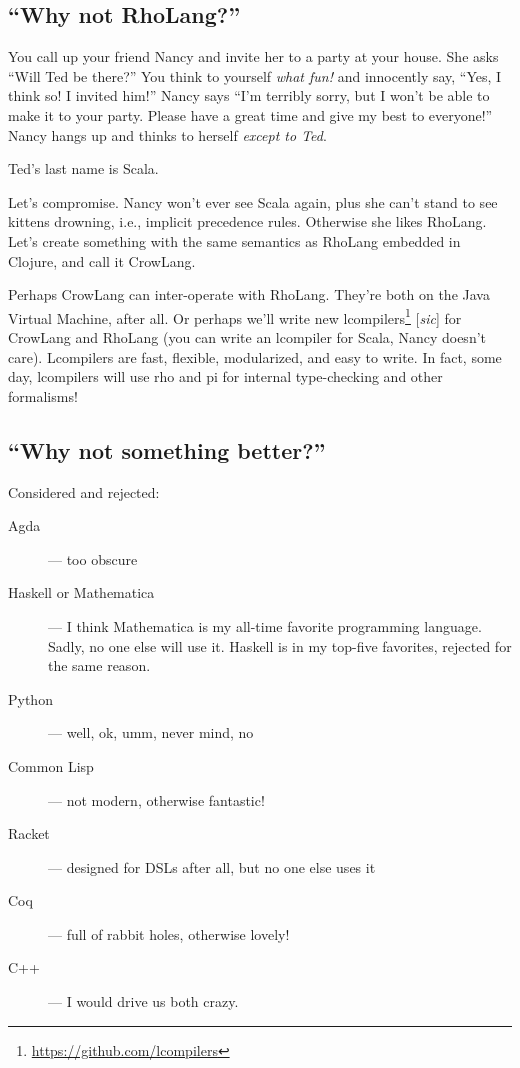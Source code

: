\documentclass[10pt,oneside,x11names]{article}
\theoremstyle{definition}
\theoremstyle{warning}
\begin{document}
\subsection{``Why not RhoLang?''}
\label{sec:orgc2be556}

You call up your friend Nancy and invite her to a party at your
house. She asks ``Will Ted be there?'' You think to yourself
\emph{what fun!} and innocently say, ``Yes, I think so! I invited him!''
Nancy says ``I'm terribly sorry, but I won't be able to make it to
your party. Please have a great time and give my best to
everyone!'' Nancy hangs up and thinks to herself \emph{except to Ted}.

Ted's last name is Scala.

Let's compromise. Nancy won't ever see Scala again, plus she can't
stand to see kittens drowning, i.e., implicit precedence rules.
Otherwise she likes RhoLang. Let's create something with the same
semantics as RhoLang embedded in Clojure, and call it CrowLang.

Perhaps CrowLang can inter-operate with RhoLang. They're both on
the Java Virtual Machine, after all. Or perhaps we'll write new
lcompilers\footnote{\url{https://github.com/lcompilers}\label{org689557b}} [\textit{sic}]
for CrowLang and RhoLang (you can write an lcompiler for Scala, Nancy
doesn't care). Lcompilers are fast, flexible, modularized, and
easy to write. In fact, some day, lcompilers will use rho and pi
for internal type-checking and other formalisms!

\subsection{``Why not something better?''}
\label{sec:orgd9bea58}

Considered and rejected:

\begin{description}
\item[{Agda}] --- too obscure

\item[{Haskell or Mathematica}] --- I think Mathematica is my all-time
favorite programming language. Sadly, no one else will use it.
Haskell is in my top-five favorites, rejected for the same reason.

\item[{Python}] --- well, ok, umm, never mind, no

\item[{Common Lisp}] --- not modern, otherwise fantastic!

\item[{Racket}] --- designed for DSLs after all, but no one else uses it

\item[{Coq}] --- full of rabbit holes, otherwise lovely!

\item[{C++}] --- I would drive us both crazy.
\end{description}
\end{document}
